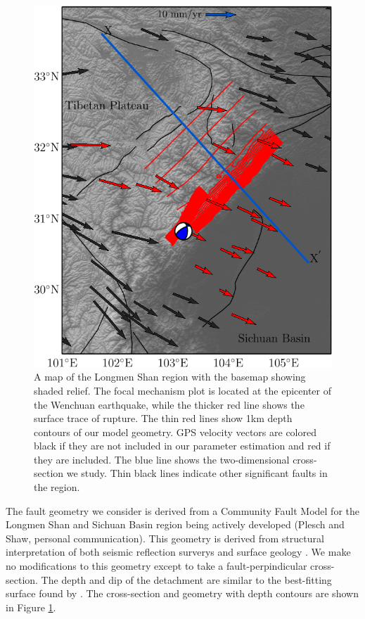 \documentclass[12pt]{article}
\begin{document}
\begin{figure}[h!]
    \centering
    \includegraphics{figs/lms_map_all.pdf}
    \caption{A map of the Longmen Shan region with the basemap showing shaded relief. The focal mechanism plot is located at the epicenter of the Wenchuan earthquake, while the thicker red line shows the surface trace of rupture. The thin red lines show 1km depth contours of our model geometry. GPS velocity vectors are colored black if they are not included in our parameter estimation and red if they are included. The blue line shows the two-dimensional cross-section we study. Thin black lines indicate other significant faults in the region.}
    \label{fig:regional_map}
\end{figure}

The fault geometry we consider is derived from a Community Fault Model for the Longmen Shan and Sichuan Basin region being actively developed (Plesch and Shaw, personal communication).  This geometry is derived from structural interpretation of both seismic reflection surverys and surface geology \citep{Hubbard2010}.  We make no modifications to this geometry except to take a fault-perpindicular cross-section. The depth and dip of the detachment are similar to the best-fitting surface found by \citet{Qi2011}. The cross-section and geometry with depth contours are shown in Figure \ref{fig:regional_map}.
\end{document}
